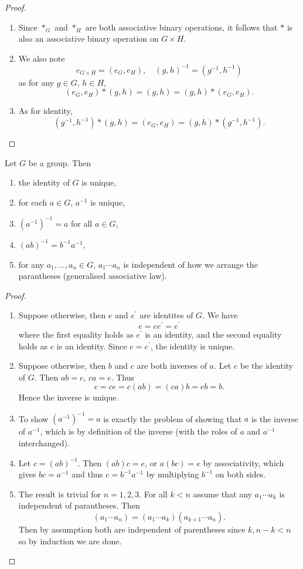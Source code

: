 \begin{proof} \
\begin{enumerate}[label=(\roman*)]
\item Since $\ast_G$ and $\ast_H$ are both associative binary operations, it follows that $\ast$ is also an associative binary operation on $G \times H$.
\item We also note
\[e_{G\times H}=(e_G,e_H),\quad(g,h)^{-1}=(g^{-1},h^{-1})\]
as for any $g \in G$, $h \in H$,
\[(e_G,e_H)\ast(g,h)=(g,h)=(g,h)\ast(e_G,e_H).\]
\item As for identity,
\[(g^{-1},h^{-1})\ast(g,h)=(e_G,e_H)=(g,h)\ast(g^{-1},h^{-1}).\]
\end{enumerate}
\end{proof}

\begin{proposition}
Let $G$ be a group. Then
\begin{enumerate}[label=(\roman*)]
\item the identity of $G$ is unique,
\item for each $a\in G$, $a^{-1}$ is unique,
\item $(a^{-1})^{-1}=a$ for all $a\in G$,
\item $(ab)^{-1}=b^{-1}a^{-1}$,
\item for any $a_1,\dots,a_n\in G$, $a_1\cdots a_n$ is independent of how we arrange the parantheses (generalised associative law).
\end{enumerate}
\end{proposition}

\begin{proof} \
\begin{enumerate}[label=(\roman*)]
\item Suppose otherwise, then $e$ and $e^\prime$ are identites of $G$. We have
\[e=ee^\prime=e^\prime\]
where the first equality holds as $e^\prime$ is an identity, and the second equality holds as $e$ is an identity. Since $e=e^\prime$, the identity is unique.
\item Suppose otherwise, then $b$ and $c$ are both inverses of $a$. Let $e$ be the identity of $G$. Then $ab=e$, $ca=e$. Thus
\[c=ce=c(ab)=(ca)b=eb=b.\]
Hence the inverse is unique.
\item To show $(a^{-1})^{-1}=a$ is exactly the problem of showing that $a$ is the inverse of $a^{-1}$, which is by definition of the inverse (with the roles of $a$ and $a^{-1}$ interchanged).
\item Let $c=(ab)^{-1}$. Then $(ab)c=e$, or $a(bc)=e$ by associativity, which gives $bc=a^{-1}$ and thus $c=b^{-1}a^{-1}$ by multiplying $b^{-1}$ on both sides.
\item The result is trivial for $n=1,2,3$. For all $k<n$ assume that any $a_1\cdots a_k$ is independent of parantheses. Then
\[(a_1\cdots a_n)=(a_1\cdots a_k)(a_{k+1}\cdots a_n).\]
Then by assumption both are independent of parentheses since $k,n-k<n$ so by induction we are done.
\end{enumerate}
\end{proof}

